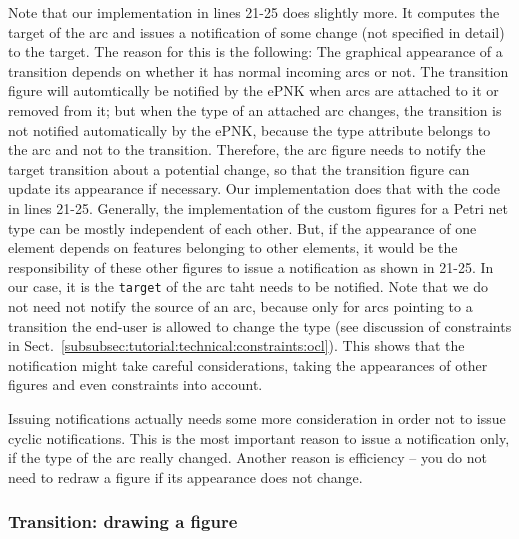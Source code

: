 Note that our implementation in lines 21-25 does slightly more. It
computes the target of the arc and issues a notification of some change
(not specified in detail) to the target. The reason for this is the following:
The graphical appearance of a transition depends on whether it has normal incoming
arcs or not. The transition figure will automtically be notified by the ePNK
when arcs are attached to it  or removed from it; but when the type of an
attached arc changes, the transition is not notified automatically by the
ePNK, because the type attribute belongs to the arc and not to the transition.
Therefore, the arc figure needs to notify the target transition about a
potential change, so that the transition figure can update its appearance
if necessary. 
Our implementation does that with the code in lines 21-25. Generally, the
implementation of the custom figures for a Petri net type can be mostly
independent of each other. But, if the appearance
of one element depends on features belonging to other elements, it would be
the responsibility of these other figures to issue a notification as
shown in 21-25. In our case, it is the {\tt target} of the arc taht needs to
be notified. Note that we do not need not notify the source of an arc, because
only for arcs pointing to a transition the end-user is allowed to change the
type (see discussion of constraints in
Sect.~\ref{subsubsec:tutorial:technical:constraints:ocl}). This shows that the
notification might take careful considerations, taking the appearances of
other figures and even constraints into account.

Issuing notifications actually needs some more consideration in order not to
issue cyclic notifications. This is the most important reason to
issue a notification only, if the type of the arc really changed. Another reason is
efficiency -- you do not need to redraw a figure if its appearance does not
change.

\subsubsection{Transition: drawing a figure}
\label{subsubsec:tutorial:technical:graphics:transition}

